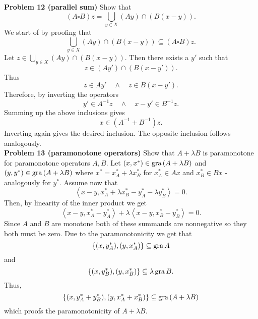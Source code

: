 \documentclass{scrartcl}
\newcommand{\sub}{\subseteq}
\theoremstyle{plain}
\theoremstyle{remark}
\newcommand{\gr}{\textup{gra}\,}
\begin{document}
\textbf{Problem 12 (parallel sum)} Show that
\begin{equation}
  (A \square B)z = \bigcup_{y \in X} (Ay) \cap (B(x-y)).
\end{equation}
We start of by proofing that
\begin{equation}
  \bigcup_{y \in X} (Ay) \cap (B(x-y)) \sub (A \square B)z.
\end{equation}
Let $z \in \bigcup_{y \in X} (Ay) \cap (B(x-y))$.
Then there exists a $y'$ such that
\begin{equation}
  z \in (Ay') \cap (B(x-y')).
\end{equation}
Thus 
\begin{equation}
  z \in A y' \quad \wedge \quad z \in B(x-y').
\end{equation}
Therefore, by inverting the operators
\begin{equation}
  y' \in A^{-1} z \quad \wedge \quad x - y' \in B^{-1}z.
\end{equation}
Summing up the above inclusions gives
\begin{equation}
  x \in (A^{-1} + B^{-1})z.
\end{equation}
Inverting again gives the desired inclusion. The opposite inclusion follows analogously.\\

\textbf{Problem 13 (paramonotone operators)} Show that $A+\lambda B$ is paramonotone for paramonotone operators $A,B$.
Let $(x,x^*) \in  \gr (A+\lambda B)$ and $(y,y^*) \in \gr (A + \lambda B)$ where $x^* = x_A^* + \lambda x_B^*$ for $x_A^* \in Ax$ and $x_B^* \in Bx$ - analogously for $y^*$.
Assume now that
\begin{equation}
  \left\langle x-y, x_A^* + \lambda x_B^* - y_A^* - \lambda y_B^* \right\rangle = 0.
\end{equation}
Then, by linearity of the inner product we get
\begin{equation}
  \left\langle x-y, x_A^*  - y_A^*  \right\rangle + \lambda \left\langle x-y, x_B^* - y_B^* \right\rangle = 0.
\end{equation}
Since $A$ and $B$ are monotone both of these summands are nonnegative so they both must be zero.
Due to the paramonotonicity we get that
\begin{equation}
  \{(x,y_A^*), (y, x_A^*) \} \sub \gr A
\end{equation}
and
\begin{equation}
  \{(x,y_B^*), (y, x_B^*) \} \sub \lambda \, \gr B.
\end{equation}
Thus,
\begin{equation}
  \{(x, y_A^* + y_B^*), (y, x_A^* + x_B^*)\} \sub \gr (A + \lambda B)
\end{equation}
which proofs the paramonotonicity of $A+\lambda B$.\\
\end{document}
